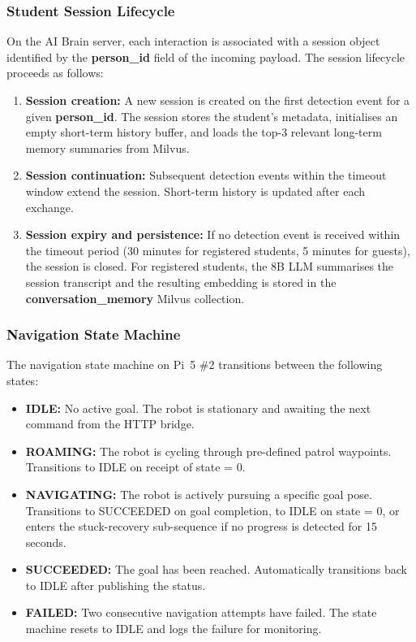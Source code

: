 \subsubsection{Student Session Lifecycle}

On the AI Brain server, each interaction is associated with a session object identified by the \textbf{person\_id} field of the incoming payload. The session lifecycle proceeds as follows:

\begin{enumerate}
    \item \textbf{Session creation:} A new session is created on the first detection event for a given \textbf{person\_id}. The session stores the student's metadata, initialises an empty short-term history buffer, and loads the top-3 relevant long-term memory summaries from Milvus.

    \item \textbf{Session continuation:} Subsequent detection events within the timeout window extend the session. Short-term history is updated after each exchange.

    \item \textbf{Session expiry and persistence:} If no detection event is received within the timeout period (30 minutes for registered students, 5 minutes for guests), the session is closed. For registered students, the 8B LLM summarises the session transcript and the resulting embedding is stored in the \textbf{conversation\_memory} Milvus collection.
\end{enumerate}

\subsubsection{Navigation State Machine}

The navigation state machine on Pi~5 \#2 transitions between the following states:

\begin{itemize}
    \item \textbf{IDLE:} No active goal. The robot is stationary and awaiting the next command from the HTTP bridge.

    \item \textbf{ROAMING:} The robot is cycling through pre-defined patrol waypoints. Transitions to IDLE on receipt of state = 0.

    \item \textbf{NAVIGATING:} The robot is actively pursuing a specific goal pose. Transitions to SUCCEEDED on goal completion, to IDLE on state = 0, or enters the stuck-recovery sub-sequence if no progress is detected for 15 seconds.

    \item \textbf{SUCCEEDED:} The goal has been reached. Automatically transitions back to IDLE after publishing the status.

    \item \textbf{FAILED:} Two consecutive navigation attempts have failed. The state machine resets to IDLE and logs the failure for monitoring.
\end{itemize}


